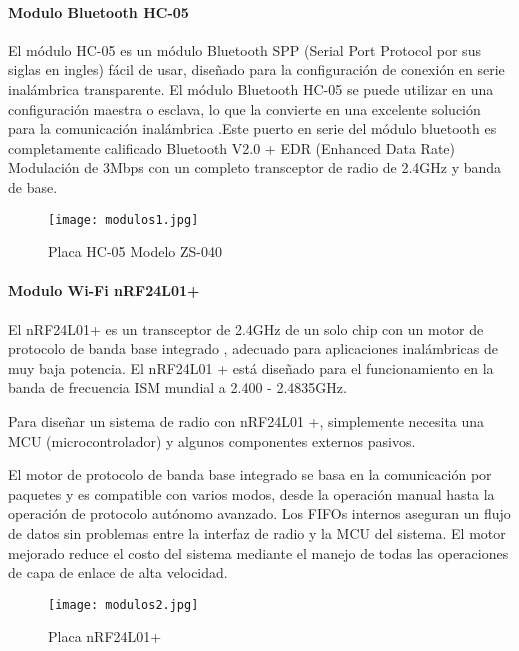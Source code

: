 \clearpage

\paragraph{Modulo Bluetooth HC-05}
El módulo HC-05 es un módulo Bluetooth SPP (Serial Port Protocol por sus siglas en ingles) fácil de usar, diseñado para la configuración de conexión en serie inalámbrica transparente. El módulo Bluetooth HC-05 se puede utilizar en una configuración maestra o esclava, lo que la convierte en una excelente solución para la comunicación inalámbrica .Este puerto en serie del módulo bluetooth es completamente calificado Bluetooth V2.0 + EDR (Enhanced Data Rate) Modulación de 3Mbps con un completo transceptor de radio de 2.4GHz y banda de base\cite{bluetooth}.

\begin{figure}[H]
	\centering
	\texttt{[image: modulos1.jpg]}
	\caption{Placa HC-05 Modelo ZS-040}
\end{figure}

\paragraph{Modulo Wi-Fi nRF24L01+}
El nRF24L01+ es un transceptor de 2.4GHz de un solo chip con un motor de protocolo de banda base integrado
, adecuado para aplicaciones inalámbricas de muy baja potencia. El nRF24L01 + está diseñado
para el funcionamiento en la banda de frecuencia ISM mundial a 2.400 - 2.4835GHz\cite{nrf}.

\par \noindent
Para diseñar un sistema de radio con nRF24L01 +, simplemente necesita una MCU (microcontrolador) y algunos componentes externos pasivos.

\par \noindent
El motor de protocolo de banda base integrado se basa en la comunicación por paquetes
y es compatible con varios modos, desde la operación manual hasta la operación de protocolo autónomo avanzado. 
Los FIFOs internos aseguran un flujo de datos sin problemas entre la interfaz de radio y la MCU del sistema. El motor mejorado reduce el costo del sistema mediante el manejo de todas las operaciones de capa de enlace de alta velocidad\cite{nrf}.

\begin{figure}[H]
	\centering
	\texttt{[image: modulos2.jpg]}
	\caption{Placa nRF24L01+}
\end{figure}

